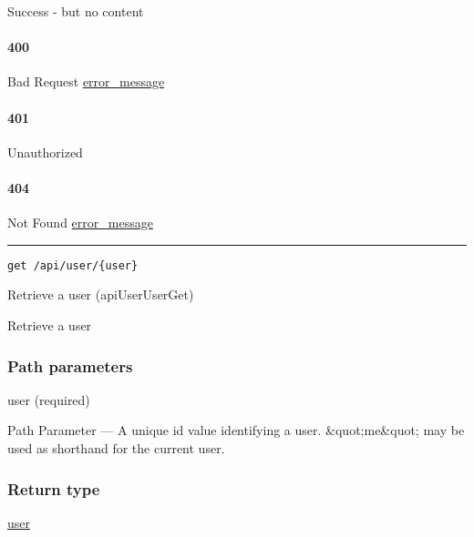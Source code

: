 Success - but no content \protect\hyperlink{}{}

\hypertarget{section-263}{%
\paragraph{400}\label{section-263}}

Bad Request \protect\hyperlink{error_message}{error\_message}

\hypertarget{section-264}{%
\paragraph{401}\label{section-264}}

Unauthorized \protect\hyperlink{}{}

\hypertarget{section-265}{%
\paragraph{404}\label{section-265}}

Not Found \protect\hyperlink{error_message}{error\_message}

\begin{center}\rule{0.5\linewidth}{\linethickness}\end{center}

\protect\hypertarget{apiUserUserGet}{}{}

\begin{verbatim}
get /api/user/{user}
\end{verbatim}

Retrieve a user ({apiUserUserGet})

Retrieve a user

\hypertarget{path-parameters-40}{%
\subsubsection{Path parameters}\label{path-parameters-40}}

user (required)

{Path Parameter} --- A unique id value identifying a user.
\&quot;me\&quot; may be used as shorthand for the current user.

\hypertarget{return-type-65}{%
\subsubsection{Return type}\label{return-type-65}}

\protect\hyperlink{user}{user}

